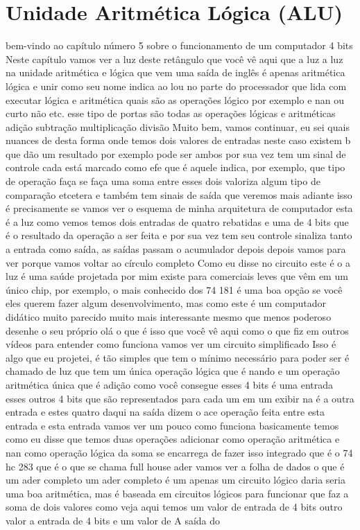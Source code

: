 \documentclass[oneside,11pt]{memoir} %
\begin{document}

\chapter{Unidade Aritmética Lógica (ALU)}
bem-vindo ao capítulo número 5 sobre  o funcionamento de um computador  4 bits  Neste capítulo vamos ver a luz deste  retângulo que você vê aqui que a luz a luz  na unidade aritmética e lógica que  vem uma saída de inglês é  apenas aritmética lógica e unir  como seu nome indica ao lou no  parte do processador que lida com  executar lógica e  aritmética quais são as operações  lógico por exemplo e nan ou curto não  etc. esse tipo de portas são  todas as operações lógicas e aritméticas  adição subtração multiplicação divisão  Muito bem, vamos continuar, eu sei quais nuances de  desta forma onde temos dois valores de  entradas neste caso existem b que dão um  resultado por exemplo pode ser ambos  por sua vez tem um sinal de controle cada  está marcado como efe que é aquele  indica, por exemplo, que tipo de operação  faça se faça uma soma entre esses dois  valoriza algum tipo de comparação  etcetera e também tem sinais de  saída que veremos mais adiante  isso é  precisamente se vamos ver o esquema de  minha arquitetura de computador  esta é a luz como vemos temos dois  entradas de quatro rebatidas e uma de  4 bits que é o resultado da  operação a ser feita e por sua vez tem  seu controle sinaliza tanto a entrada  como saída, as saídas passam  o acumulador depois depois vamos  para ver porque  vamos voltar ao círculo completo  Como eu disse no circuito este é o  a luz é uma saúde projetada por mim existe  para comerciais leves que vêm em um único  chip, por exemplo, o mais conhecido dos  74 181 é uma boa opção se você  eles querem fazer algum desenvolvimento, mas como  este é um computador  didático muito parecido muito mais  interessante mesmo que menos poderoso  desenhe o seu próprio  olá o que é isso que você vê aqui como o que  fiz em outros vídeos para entender como  funciona vamos ver um circuito  simplificado  Isso é algo que eu projetei, é tão simples que  tem o mínimo necessário para poder  ser é chamado de luz que tem um  única operação lógica que é nando e um  operação aritmética única que é adição  como você consegue esses 4 bits é uma entrada  esses outros 4 bits que são  representados para cada um em um  exibir na é a outra entrada e estes  quatro daqui na saída dizem o  ace operação feita entre esta entrada  e esta entrada vamos ver um pouco  como funciona  basicamente temos como eu disse que temos  duas operações adicionar como operação  aritmética e nan como operação lógica  da soma se encarrega de fazer isso  integrado que é o 74  hc 283 que é o que se chama full house  ader vamos ver a folha de dados  o que é um ader completo um ader completo é um  apenas um circuito lógico daria  seria uma boa aritmética, mas é baseada em  circuitos lógicos para funcionar que  faz a soma de dois valores como  veja aqui temos  um valor de entrada de 4 bits outro valor  a entrada de 4 bits e um valor de  A saída do 
\end{document}
